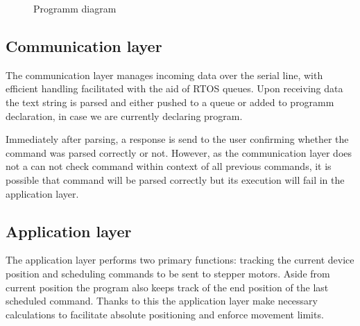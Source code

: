 \begin{figure}[h!]

  \caption[Programm diagram]{Programm diagram}
  \label{fig:code_diag}
\end{figure}

\subsection{Communication layer}

The communication layer manages incoming data over the serial line, with efficient handling facilitated with the aid of RTOS queues.
Upon receiving data the text string is parsed and either pushed to a queue or added to programm declaration, in case we are currently declaring program.

Immediately after parsing, a response is send to the user confirming whether the command was parsed correctly or not.
However, as the communication layer does not a can not check command within context of all previous commands, it is possible that command will be parsed correctly but its execution will fail in the application layer.



\subsection{Application layer}

The application layer performs two primary functions: tracking the current device position and scheduling commands to be sent to stepper motors.
Aside from current position the program also keeps track of the end position of the last scheduled command.
Thanks to this the application layer make necessary calculations to facilitate absolute positioning and enforce movement limits.

